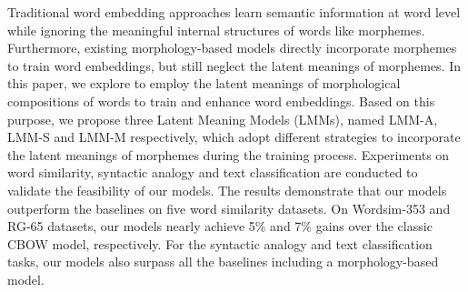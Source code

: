 Traditional word embedding approaches learn semantic information at word level while ignoring the meaningful internal structures of words like morphemes. Furthermore, existing morphology-based models directly incorporate morphemes to train word embeddings, but still neglect the latent meanings of morphemes. In this paper, we explore to employ the latent meanings of morphological compositions of words to train and enhance word embeddings. Based on this purpose, we propose three Latent Meaning Models (LMMs), named LMM-A, LMM-S and LMM-M respectively, which adopt different strategies to incorporate the latent meanings of morphemes during the training process. Experiments on word similarity, syntactic analogy and text classification are conducted to validate the feasibility of our models. The results demonstrate that our models outperform the baselines on five word similarity datasets. On Wordsim-353 and RG-65 datasets, our models nearly achieve 5\% and 7\% gains over  the classic CBOW model, respectively. For the syntactic analogy and text classification tasks, our models also surpass all the baselines including a morphology-based model.
